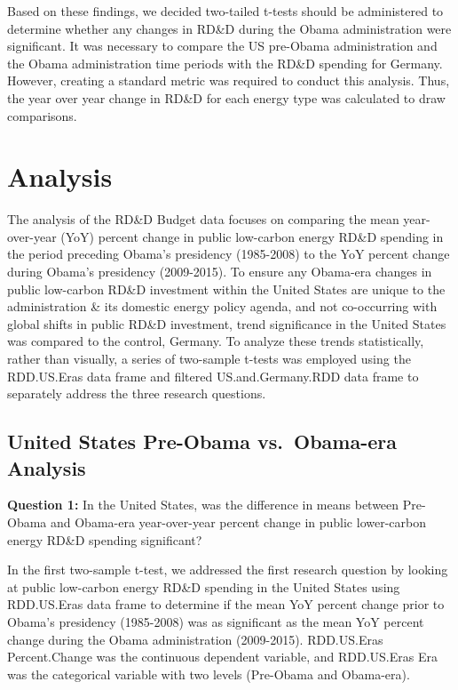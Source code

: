\documentclass[
  12pt,
]{article}
\begin{document}
Based on these findings, we decided two-tailed t-tests should be
administered to determine whether any changes in RD\&D during the Obama
administration were significant. It was necessary to compare the US
pre-Obama administration and the Obama administration time periods with
the RD\&D spending for Germany. However, creating a standard metric was
required to conduct this analysis. Thus, the year over year change in
RD\&D for each energy type was calculated to draw comparisons.

\newpage

\hypertarget{analysis}{%
\section{Analysis}\label{analysis}}

The analysis of the RD\&D Budget data focuses on comparing the mean
year-over-year (YoY) percent change in public low-carbon energy RD\&D
spending in the period preceding Obama's presidency (1985-2008) to the
YoY percent change during Obama's presidency (2009-2015). To ensure any
Obama-era changes in public low-carbon RD\&D investment within the
United States are unique to the administration \& its domestic energy
policy agenda, and not co-occurring with global shifts in public RD\&D
investment, trend significance in the United States was compared to the
control, Germany. To analyze these trends statistically, rather than
visually, a series of two-sample t-tests was employed using the
RDD.US.Eras data frame and filtered US.and.Germany.RDD data frame to
separately address the three research questions.

\hypertarget{united-states-pre-obama-vs.-obama-era-analysis}{%
\subsection{United States Pre-Obama vs.~Obama-era
Analysis}\label{united-states-pre-obama-vs.-obama-era-analysis}}

\textbf{Question 1:} In the United States, was the difference in means
between Pre-Obama and Obama-era year-over-year percent change in public
lower-carbon energy RD\&D spending significant?

In the first two-sample t-test, we addressed the first research question
by looking at public low-carbon energy RD\&D spending in the United
States using RDD.US.Eras data frame to determine if the mean YoY percent
change prior to Obama's presidency (1985-2008) was as significant as the
mean YoY percent change during the Obama administration (2009-2015).
RDD.US.Eras Percent.Change was the continuous dependent variable, and
RDD.US.Eras Era was the categorical variable with two levels (Pre-Obama
and Obama-era).
\end{document}
